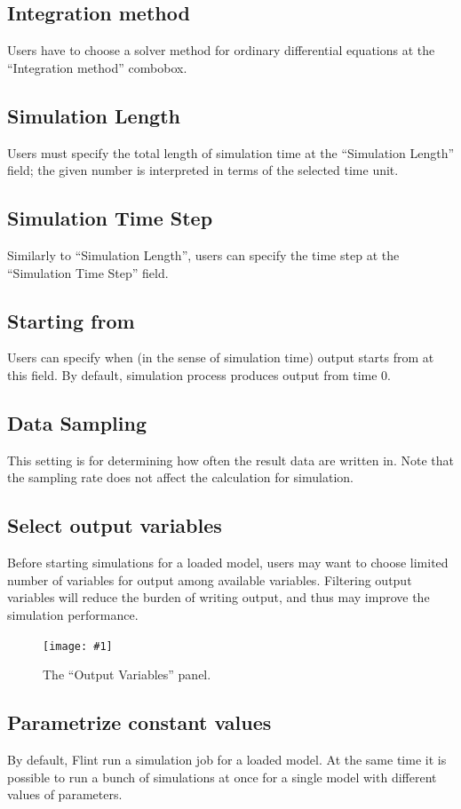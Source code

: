 \documentclass[a4paper,10pt]{report}
\newcommand\FigureOfImage[2]{\begin{figure}[h]
  \centering
  \texttt{[image: \#1]}
  \caption{#2}\label{fig:#1}
\end{figure}}
\begin{document}
\subsection{Integration method}
Users have to choose a solver method for ordinary differential equations at the
``Integration method'' combobox.

\subsection{Simulation Length}
Users must specify the total length of simulation time at the ``Simulation Length''
field; the given number is interpreted in terms of the selected time unit.

\subsection{Simulation Time Step}
Similarly to ``Simulation Length'', users can specify the time step at the
``Simulation Time Step'' field.

\subsection{Starting from}
Users can specify when (in the sense of simulation time) output starts from
at this field. By default, simulation process produces output from time 0.

\subsection{Data Sampling}
This setting is for determining how often the result data are written in.
Note that the sampling rate does not affect the calculation for simulation.

\subsection{Select output variables}
Before starting simulations for a loaded model, users may want to choose limited
number of variables for output among available variables. Filtering output
variables will reduce the burden of writing output, and thus may improve the
simulation performance.
\FigureOfImage{lr-output-variables}{The ``Output Variables'' panel.}

\subsection{Parametrize constant values}
By default, Flint run a simulation job for a loaded model. At the same time
it is possible to run a bunch of simulations at once for a single model with
different values of parameters.
\end{document}
